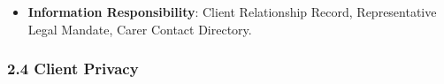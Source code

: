 \begin{itemize}
\begin{itemize}
\begin{itemize}
\item 
\emph{Exposed Service}: \texttt{} — Confirms legal decision-making authority for substitute consent.



\end{itemize}


\end{itemize}


\item 
\textbf{Information Responsibility}: Client Relationship Record, Representative Legal Mandate, Carer Contact Directory.



\end{itemize}
\label{rad:em:66}

\par\smallskip
{}\label{rad:em:68}
\subsubsection*{2.4 Client Privacy}
\label{rad:em:69}

